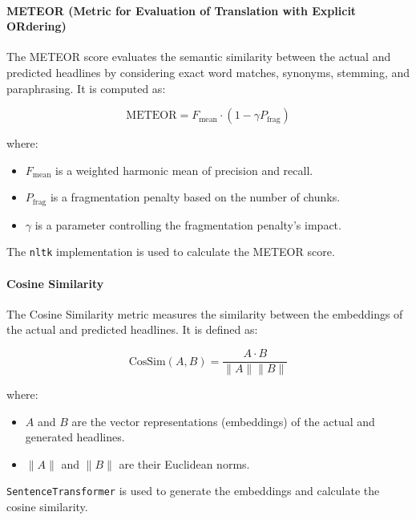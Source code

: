 \paragraph{METEOR (Metric for Evaluation of Translation with Explicit ORdering)}
The METEOR score evaluates the semantic similarity between the actual and predicted headlines by considering exact word matches, synonyms, stemming, and paraphrasing. It is computed as:

\begin{equation}
\text{METEOR} = F_{\text{mean}} \cdot (1 - \gamma P_{\text{frag}})
\end{equation}

where:
\begin{itemize}
    \item \( F_{\text{mean}} \) is a weighted harmonic mean of precision and recall.
    \item \( P_{\text{frag}} \) is a fragmentation penalty based on the number of chunks.
    \item \( \gamma \) is a parameter controlling the fragmentation penalty's impact.
\end{itemize}

The \texttt{nltk} implementation is used to calculate the METEOR score.

\paragraph{Cosine Similarity}
The Cosine Similarity metric measures the similarity between the embeddings of the actual and predicted headlines. It is defined as:

\begin{equation}
\text{CosSim}(A, B) = \frac{A \cdot B}{\|A\| \|B\|}
\end{equation}

where:
\begin{itemize}
    \item \( A \) and \( B \) are the vector representations (embeddings) of the actual and generated headlines.
    \item \( \|A\| \) and \( \|B\| \) are their Euclidean norms.
\end{itemize}
\texttt{SentenceTransformer} is used to generate the embeddings and calculate the cosine similarity.

